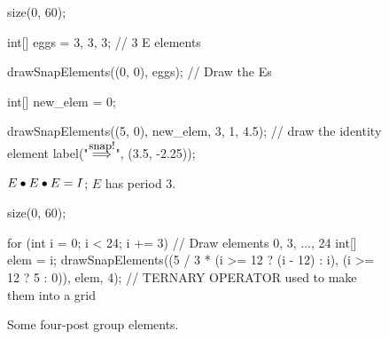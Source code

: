\documentclass[../gatm.tex]{subfiles}
\begin{document}
\begin{figure}
	\begin{minipage}{.5\textwidth}
		\begin{center}
			\begin{asy}
				size(0, 60);

				int[] eggs = {3, 3, 3}; // 3 E elements

				drawSnapElements((0, 0), eggs); // Draw the Es

				int[] new_elem = {0};

				drawSnapElements((5, 0), new_elem, 3, 1, 4.5); // draw the identity element
				label("$\stackrel{\mbox{\small snap!}}{\Longrightarrow}$", (3.5, -2.25));
			\end{asy}

			\caption{$E\bullet E\bullet E = I$; $E$ has period $3$.}
			\label{fig:eper3}
		\end{center}
	\end{minipage}%
	\begin{minipage}{.4\textwidth}
		\begin{center}
			\begin{asy}
				size(0, 60);

				for (int i = 0; i < 24; i += 3) { // Draw elements 0, 3, ..., 24
					int[] elem = {i};
					drawSnapElements((5 / 3 * (i >= 12 ? (i - 12) : i), (i >= 12 ? 5 : 0)), elem, 4); // TERNARY OPERATOR used to make them into a grid
				}
			\end{asy}

			\caption{Some four-post group elements.}
			\label{fig:fpge}
		\end{center}
	\end{minipage}
\end{figure}
\end{document}
